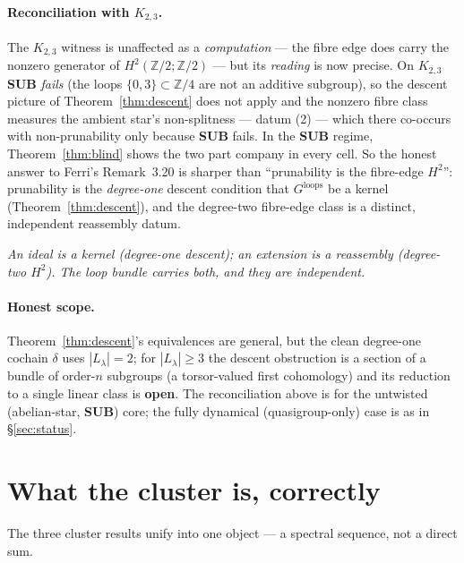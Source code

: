 \documentclass[11pt]{article}
\theoremstyle{definition}
\newcommand{\Z}{\mathbb{Z}}
\newcommand{\loops}{\mathrm{loops}}
\begin{document}
\paragraph{Reconciliation with $K_{2,3}$.} The $K_{2,3}$ witness is unaffected as a
\emph{computation} --- the fibre edge does carry the nonzero generator of $H^2(\Z/2;\Z/2)$ --- but
its \emph{reading} is now precise. On $K_{2,3}$ \textbf{SUB} \emph{fails} (the loops $\{0,3\}\subset
\Z/4$ are not an additive subgroup), so the descent picture of Theorem~\ref{thm:descent} does not
apply and the nonzero fibre class measures the ambient star's non-splitness --- datum (2) --- which
there co-occurs with non-prunability only because \textbf{SUB} fails. In the \textbf{SUB} regime,
Theorem~\ref{thm:blind} shows the two part company in every cell. So the honest answer to Ferri's
Remark~3.20 is sharper than ``prunability is the fibre-edge $H^2$'': prunability is the
\emph{degree-one} descent condition that $G^{\loops}$ be a kernel (Theorem~\ref{thm:descent}), and
the degree-two fibre-edge class is a distinct, independent reassembly datum.

\begin{center}\itshape An ideal is a kernel (degree-one descent); an extension is a reassembly
(degree-two $H^2$). The loop bundle carries both, and they are independent.\end{center}

\paragraph{Honest scope.} Theorem~\ref{thm:descent}'s equivalences are general, but the clean
degree-one cochain $\delta$ uses $|L_\lambda|=2$; for $|L_\lambda|\ge3$ the descent obstruction is a
section of a bundle of order-$n$ subgroups (a torsor-valued first cohomology) and its reduction to a
single linear class is \textbf{open}. The reconciliation above is for the untwisted (abelian-star,
\textbf{SUB}) core; the fully dynamical (quasigroup-only) case is as in \S\ref{sec:status}.

\section{What the cluster is, correctly}\label{sec:unify}

The three cluster results unify into one object --- a spectral sequence, not a direct sum.
\end{document}
